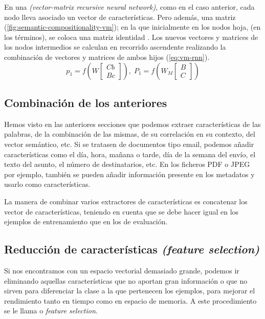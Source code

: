 En una  \emph{(vector-matrix recursive neural network)}, como en el caso anterior, cada nodo lleva asociado un vector de características. Pero además, una matriz (\autoref{fig:semantic-compositionality-vm}); en la que inicialmente en los nodos hoja, (en los términos), se coloca una matriz identidad \citep{Socher2013}. Los nuevos vectores y matrices de los nodos intermedios se calculan en recorrido ascendente realizando la combinación de vectores y matrices de ambos hijos (\autoref{eq:vm-rnn}).
\begin{equation}
p_1 = f\left( W \left[\begin{array}{c}Cb \\Bc\end{array}\right] \right), \;
P_1 = f\left( W_M \left[\begin{array}{c}B \\C\end{array}\right] \right)
\label{eq:vm-rnn}
\end{equation}

\FloatBarrier
\subsection{Combinación de los anteriores}

Hemos visto en las anteriores secciones que podemos extraer características de las palabras, de la combinación de las mismas, de su correlación en su contexto, del vector semántico, etc. Si se tratasen de documentos tipo email, podemos añadir características como el día, hora, mañana o tarde, día de la semana del envío, el texto del asunto, el número de destinatarios, etc. En los ficheros PDF o JPEG por ejemplo, también se pueden añadir información presente en los metadatos y usarlo como características.

La manera de combinar varios extractores de características es concatenar los vector de características, teniendo en cuenta que se debe hacer igual en los ejemplos de entrenamiento que en los de evaluación.

\FloatBarrier
\subsection{Reducción de características \emph{(feature selection)}}

Si nos encontramos con un espacio vectorial demasiado grande, podemos ir eliminando aquellas características que no aportan gran información o que no sirven para diferenciar la clase a la que pertenecen los ejemplos, para mejorar el rendimiento tanto en tiempo como en espacio de memoria. A este procedimiento se le llama  o \emph{feature selection}.

